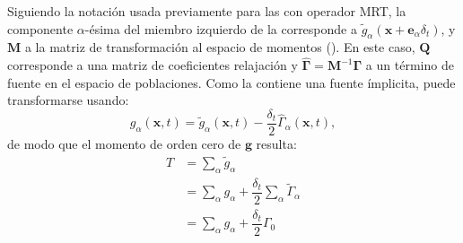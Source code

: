 Siguiendo la notaci\'on usada previamente para las \lbe{} con operador MRT, la componente $\alpha$-\'esima del miembro izquierdo de la  corresponde  a $\tilde{g}_{\alpha}(\bm{x}+\bm{e}_{\alpha}\delta_t)$, y $\bm{M}$ a la matriz de transformaci\'on al espacio de momentos ().  En este caso, $\bm{Q}$ corresponde a una matriz de coeficientes relajaci\'on y $\hat{\bm{\Gamma}} = \bm{M}^{-1}\bm{\Gamma}$ a un t\'ermino de fuente en el espacio de poblaciones. Como la  contiene una fuente \'implicita, puede transformarse usando:
\begin{equation}
	g_{\alpha}(\bm{x},t) = \tilde{g}_{\alpha} (\bm{x},t) - \dfrac{\delta_t}{2} \hat{\Gamma}_{\alpha}(\bm{x},t),
	\label{eq:g_tilde_tranf_2d}
\end{equation}
de modo que el momento de orden cero de $\bm{g}$ resulta:
\begin{equation}
	\begin{aligned}
		T &= \sum_{\alpha} \tilde{g}_{\alpha} \\
		  &= \sum_{\alpha} g_{\alpha} + \dfrac{\delta_t}{2} \sum_{\alpha} \tilde{\Gamma}_{\alpha} \\
		  &= \sum_{\alpha} g_{\alpha} + \dfrac{\delta_t}{2} \Gamma_0
	\end{aligned}
	\label{eq:T_macro_2d}
\end{equation}

